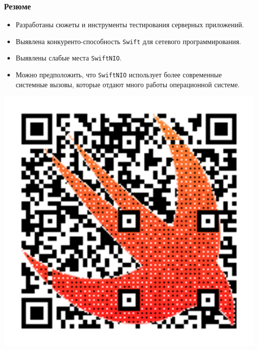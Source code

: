\documentclass[10pt,xcolor={table,dvipsnames},t]{beamer}
\begin{document}
\begin{frame}
\frametitle{Резюме}
\begin{itemize}
  \item Разработаны сюжеты и инструменты тестирования серверных приложений.
  \item Выявлена конкуренто-способность \texttt{Swift} для сетевого программирования.
  \item Выявлены слабые места \texttt{SwiftNIO}. 
  \item Можно предположить, что \texttt{SwiftNIO} использует более современные системные вызовы, которые отдают много работы операционной системе. 
\end{itemize}
\vspace{0.6cm}
\includegraphics[scale=0.14,right]{swift_logo_qrcode.png}


\end{frame}
\end{document}
